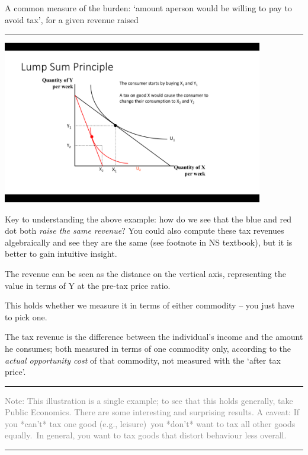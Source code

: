 \documentclass[]{article}
\begin{document}
A common measure of the burden: `amount aperson would be willing to pay to avoid tax', for a given revenue raised

\begin{center}\rule{0.5\linewidth}{\linethickness}\end{center}

\includegraphics[height=2.8in]{picsfigs/lumpsum1.png}

Key to understanding the above example: how do we see that the blue and red dot both \emph{raise the same revenue}? You could also compute these tax revenues algebraically and see they are the same (see footnote in NS textbook), but it is better to gain intuitive insight.

The revenue can be seen as the distance on the vertical axis, representing the value in terms of Y at the pre-tax price ratio.

This holds whether we measure it in terms of either commodity -- you just have to pick one.

The tax revenue is the difference between the individual's income and the amount he consumes; both measured in terms of one commodity only,
according to the \emph{actual opportunity cost} of that commodity, not measured with the `after tax price'.

\begin{center}\rule{0.5\linewidth}{\linethickness}\end{center}

\textcolor{gray}{Note: This illustration is a single example; to see that this holds generally, take Public Economics. There are some interesting and surprising results. A caveat: If you *can't* tax one good (e.g., leisure)\
 you *don't* want to tax all other goods equally.\
 In general, you want to tax goods that distort behaviour less overall.}

\begin{center}\rule{0.5\linewidth}{\linethickness}\end{center}
\end{document}

